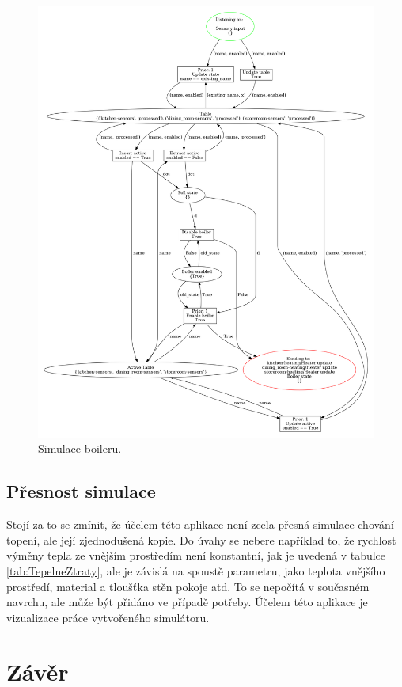 \begin{figure}[httb]
  \centering
  \includegraphics[width=\textwidth]{obrazky-figures/boiler-logic.png}
  \caption{Simulace boileru.}
  \label{boiler-logic-viz}
\end{figure}

\section{Přesnost simulace}

Stojí za to se zmínit, že účelem této aplikace není zcela přesná simulace chování topení, ale její zjednodušená kopie. Do úvahy se nebere například to, že rychlost výměny tepla ze vnějším prostředím není konstantní, jak je uvedená v tabulce \ref{tab:TepelneZtraty}, ale je závislá na spoustě parametru, jako teplota vnějšího prostředí, material a tloušťka stěn pokoje atd. To se nepočítá v současném navrchu, ale může být přidáno ve případě potřeby. Účelem této aplikace je vizualizace práce vytvořeného simulátoru.

\chapter{Závěr}
\label{zaver}
